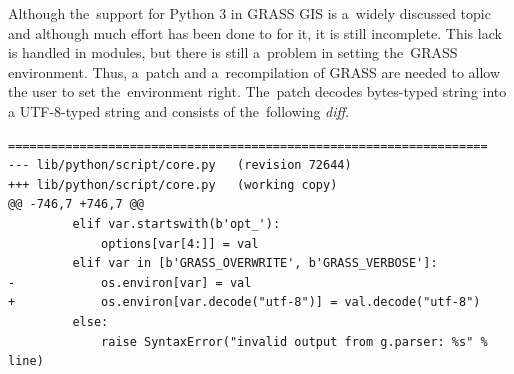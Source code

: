 Although the~support for Python 3 in GRASS GIS is a~widely discussed topic and
although much effort has been done to for it, it is still incomplete. This
lack is handled in modules, but there is still a~problem in setting the~GRASS
environment. Thus, a~patch and a~recompilation of GRASS are needed to allow the
user to set the~environment right. The~patch decodes bytes-typed string into a
UTF-8-typed string and consists of the~following \textit{diff}.

{\scriptsize
\begin{lstlisting}[basicstyle={\footnotesize\ttfamily},breaklines=True,
backgroundcolor = \color{light-gray}]
===================================================================
--- lib/python/script/core.py	(revision 72644)
+++ lib/python/script/core.py	(working copy)
@@ -746,7 +746,7 @@
         elif var.startswith(b'opt_'):
             options[var[4:]] = val
         elif var in [b'GRASS_OVERWRITE', b'GRASS_VERBOSE']:
-            os.environ[var] = val
+            os.environ[var.decode("utf-8")] = val.decode("utf-8")
         else:
             raise SyntaxError("invalid output from g.parser: %s" % line)
\end{lstlisting}}
